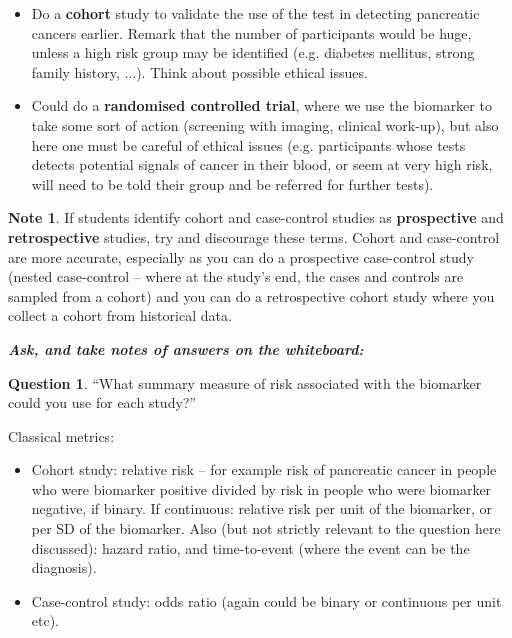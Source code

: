 \documentclass[a4paper,11pt]{scrartcl}
\theoremstyle{plain}
\theoremstyle{remark}
\theoremstyle{definition}
\newtheorem{note}[thm]{Note}
\newtheorem{quest}[thm]{Question}
\begin{document}
{\begin{itshape}
\begin{itemize}
\begin{itemize}
	\end{itemize}
\item Do a \textbf{cohort} study to validate the use of the test in detecting pancreatic cancers earlier. Remark that the number of participants would be huge, unless a high risk group may be identified (e.g. diabetes mellitus, strong family history, ...). Think about possible ethical issues.
\item Could do a \textbf{randomised controlled trial}, where we use the biomarker to take some sort of action (screening with imaging, clinical work-up), but also here one must be careful of ethical issues (e.g. participants whose tests detects potential signals of cancer in their blood, or seem at very high risk, will need to be told their group and be referred for further tests).
\end{itemize}
\end{itshape}

\begin{note}
If students identify cohort and case-control studies as \textbf{prospective} and \textbf{retrospective} studies, try and discourage these terms. Cohort and case-control are more accurate, especially as you can do a prospective case-control study (nested case-control – where at the study's end, the cases and controls are sampled from a cohort) and you can do a retrospective cohort study where you collect a cohort from historical data.
\end{note}

\textit{\textbf{Ask, and take notes of answers on the whiteboard:}}

\begin{quest} ``What summary measure of risk associated with the biomarker could you use for each study?''
\end{quest}

\begin{itshape}
Classical metrics:
\begin{itemize}
\item Cohort study: relative risk – for example risk of pancreatic cancer in people who were biomarker positive divided by risk  in people who were biomarker negative, if binary. If continuous: relative risk per unit of the biomarker, or per SD of the biomarker. Also (but not strictly relevant to the question here discussed): hazard ratio, and time-to-event (where the event can be the diagnosis).
\item Case-control study:  odds ratio (again could be binary or continuous per unit etc).
\end{itemize}


\end{itshape}}
\end{document}
